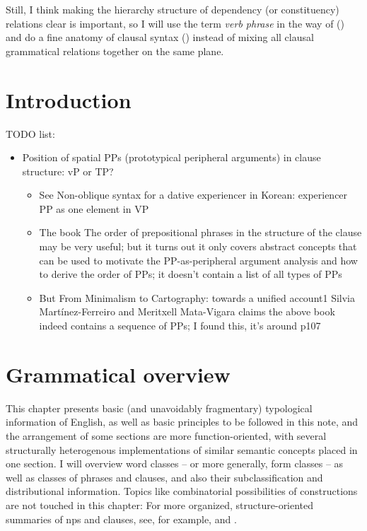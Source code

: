 \documentclass[UTF8, a4paper, oneside, scheme=plain]{ctexrep}
\newcommand*{\term}[1]{\emph{#1}}
\begin{document}
Still, I think making the hierarchy structure of dependency (or constituency) relations clear 
is important,
so I will use the term \term{verb phrase} in the way of \citet{cgel} ()
and do a fine anatomy of clausal syntax ()
instead of mixing all clausal grammatical relations together on the same plane.

\chapter{Introduction}

\setcounter{page}{1}

TODO list:
\begin{itemize}
    \item Position of spatial PPs (prototypical peripheral arguments) in clause structure: vP or TP?
    \begin{itemize}
        \item See Non-oblique syntax for a dative experiencer in Korean: experiencer PP as one element in VP
        \item The book The order of prepositional phrases in the structure of the clause may be very useful;
        but it turns out it only covers abstract concepts that can be used to motivate the PP-as-peripheral argument analysis and how to derive the order of PPs; it doesn't contain a list of all types of PPs
        \item But From Minimalism to Cartography: towards a unified account1
        Silvia Martínez-Ferreiro and Meritxell Mata-Vigara claims the above book indeed contains 
        a sequence of PPs; I found this, it's around p107
    \end{itemize}
\end{itemize}

\chapter{Grammatical overview}

This chapter presents basic (and unavoidably fragmentary) typological information of English,
as well as basic principles to be followed in this note,
and the arrangement of some sections are more function-oriented, 
with several structurally heterogenous implementations of 
similar semantic concepts placed in one section.
I will overview word classes -- or more generally, form classes -- 
as well as classes of phrases and clauses,
and also their subclassification and distributional information.
Topics like combinatorial possibilities of constructions
are not touched in this chapter:
For more organized, structure-oriented summaries of 
\acs{np}s and clauses, 
see, for example,  and .
\end{document}
